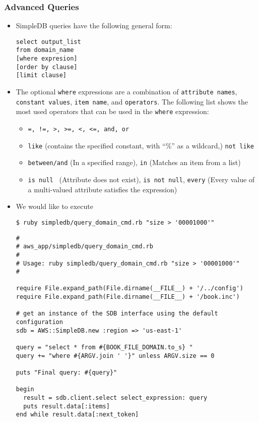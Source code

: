 \documentclass{beamer}
\begin{document}
\begin{frame}
\frametitle{Advanced Queries}
\begin{itemize}
\item SimpleDB queries have the following general form:
\lstset{language=Ruby}
\begin{lstlisting}
select output_list
from domain_name
[where expresion]
[order by clause]
[limit clause]
\end{lstlisting}

\item The optional \texttt{where} expressions are a combination of \texttt{attribute names}, \texttt{constant
values}, \texttt{item name}, and \texttt{operators}. The following list shows the most used operators that
can be used in the \texttt{where} expression:
\begin{itemize}
\item \texttt{=, !=, >, >=, <, <=, and, or}
\item \texttt{like} (contains the specified constant, with “\%” as a wildcard,) \texttt{not like}
\item \texttt{between/and} (In a specified range), \texttt{in} (Matches an item from a list)
\item \texttt{is null } (Attribute does not exist), \texttt{is not null}, \texttt{every} (Every value of a multi-valued attribute satisfies the expression)
\end{itemize}

\item We would like to execute 
\lstset{language=shell}
\begin{lstlisting}
$ ruby simpledb/query_domain_cmd.rb "size > '00001000'"
\end{lstlisting}

\lstset{language=Ruby, style=eclipse}
\begin{lstlisting}
#
# aws_app/simpledb/query_domain_cmd.rb
#
# Usage: ruby simpledb/query_domain_cmd.rb "size > '00001000'"
#

require File.expand_path(File.dirname(__FILE__) + '/../config')
require File.expand_path(File.dirname(__FILE__) + '/book.inc')

# get an instance of the SDB interface using the default configuration
sdb = AWS::SimpleDB.new :region => 'us-east-1'

query = "select * from #{BOOK_FILE_DOMAIN.to_s} "
query += "where #{ARGV.join ' '}" unless ARGV.size == 0

puts "Final query: #{query}"

begin
  result = sdb.client.select select_expression: query
  puts result.data[:items]
end while result.data[:next_token]
\end{lstlisting}
\end{itemize}
\end{frame}
\end{document}
